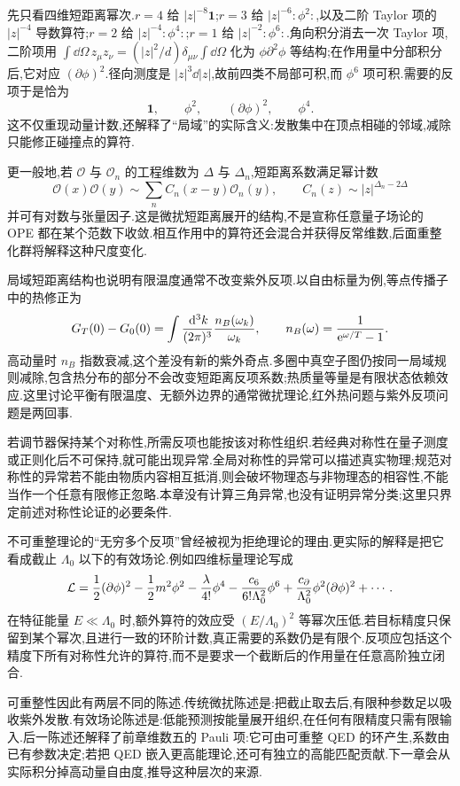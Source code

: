 先只看四维短距离幂次.$r=4$ 给 $|z|^{-8}\mathbf1$;$r=3$ 给 $|z|^{-6}:\phi^2:$,以及二阶 Taylor 项的 $|z|^{-4}$ 导数算符;$r=2$ 给 $|z|^{-4}:\phi^4:$;$r=1$ 给 $|z|^{-2}:\phi^6:$.角向积分消去一次 Taylor 项,二阶项用
$\int\dd\Omega\,z_\mu z_\nu=(|z|^2/d)\delta_{\mu\nu}\int\dd\Omega$ 化为 $\phi\partial^2\phi$ 等结构;在作用量中分部积分后,它对应 $(\partial\phi)^2$.径向测度是 $|z|^3\dd|z|$,故前四类不局部可积,而 $\phi^6$ 项可积.需要的反项于是恰为
\begin{equation}
 \mathbf1,\qquad \phi^2,\qquad (\partial\phi)^2,\qquad \phi^4.
\end{equation}
这不仅重现动量计数,还解释了“局域”的实际含义:发散集中在顶点相碰的邻域,减除只能修正碰撞点的算符.

更一般地,若 $\mathcal O$ 与 $\mathcal O_n$ 的工程维数为 $\Delta$ 与 $\Delta_n$,短距离系数满足幂计数
\begin{equation}
 \mathcal O(x)\mathcal O(y)\sim\sum_n C_n(x-y)\mathcal O_n(y),
 \qquad C_n(z)\sim |z|^{\Delta_n-2\Delta}
\end{equation}
并可有对数与张量因子.这是微扰短距离展开的结构,不是宣称任意量子场论的 OPE 都在某个范数下收敛.相互作用中的算符还会混合并获得反常维数,后面重整化群将解释这种尺度变化.

局域短距离结构也说明有限温度通常不改变紫外反项.以自由标量为例,等点传播子中的热修正为
\begin{equation}
 G_T(0)-G_0(0)=\int\frac{\,\mathrm d^3k}{(2\pi)^3}
            \frac{n_B(\omega_k)}{\omega_k},\qquad
 n_B(\omega)=\frac1{\mathrm e^{\omega/T}-1}.
\end{equation}
高动量时 $n_B$ 指数衰减,这个差没有新的紫外奇点.多圈中真空子图仍按同一局域规则减除,包含热分布的部分不会改变短距离反项系数;热质量等量是有限状态依赖效应.这里讨论平衡有限温度、无额外边界的通常微扰理论,红外热问题与紫外反项问题是两回事.


若调节器保持某个对称性,所需反项也能按该对称性组织.若经典对称性在量子测度或正则化后不可保持,就可能出现异常.全局对称性的异常可以描述真实物理;规范对称性的异常若不能由物质内容相互抵消,则会破坏物理态与非物理态的相容性,不能当作一个任意有限修正忽略.本章没有计算三角异常,也没有证明异常分类;这里只界定前述对称性论证的必要条件.

不可重整理论的“无穷多个反项”曾经被视为拒绝理论的理由.更实际的解释是把它看成截止 $\Lambda_0$ 以下的有效场论.例如四维标量理论写成
\begin{equation}
 \mathcal L=\frac12(\partial\phi)^2-\frac12m^2\phi^2
       -\frac\lambda{4!}\phi^4
       -\frac{c_6}{6!\Lambda_0^2}\phi^6
       +\frac{c_\partial}{\Lambda_0^2}\phi^2(\partial\phi)^2+\cdots.
\end{equation}
在特征能量 $E\ll\Lambda_0$ 时,额外算符的效应受 $(E/\Lambda_0)^2$ 等幂次压低.若目标精度只保留到某个幂次,且进行一致的环阶计数,真正需要的系数仍是有限个.反项应包括这个精度下所有对称性允许的算符,而不是要求一个截断后的作用量在任意高阶独立闭合.

可重整性因此有两层不同的陈述.传统微扰陈述是:把截止取去后,有限种参数足以吸收紫外发散.有效场论陈述是:低能预测按能量展开组织,在任何有限精度只需有限输入.后一陈述还解释了前章维数五的 Pauli 项:它可由可重整 QED 的环产生,系数由已有参数决定;若把 QED 嵌入更高能理论,还可有独立的高能匹配贡献.下一章会从实际积分掉高动量自由度,推导这种层次的来源.

